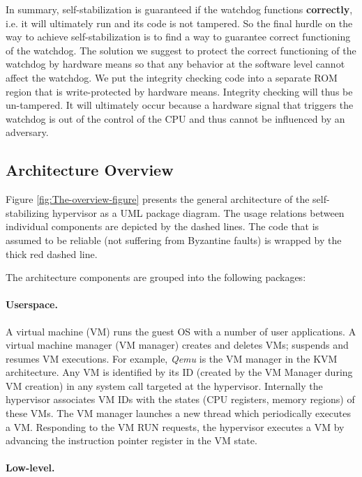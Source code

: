 In summary, self-stabilization is guaranteed if the watchdog functions
\textbf{correctly}, i.e. it will ultimately run and its code is not
tampered. So the final hurdle on the way to achieve self-stabilization
is to find a way to guarantee correct functioning of the watchdog.
The solution we suggest to protect the correct functioning of the
watchdog by hardware means so that any behavior at the software level
cannot affect the watchdog. We put the integrity checking code into
a separate ROM region that is write-protected by hardware means. Integrity
checking will thus be un-tampered. It will ultimately occur because
a hardware signal that triggers the watchdog is out of the control
of the CPU and thus cannot be influenced by an adversary.


\subsection{Architecture Overview }

Figure \ref{fig:The-overview-figure} presents the general architecture
of the self-stabilizing hypervisor as a UML package diagram. The usage
relations between individual components are depicted by the dashed
lines. The code that is assumed to be reliable (not suffering from
Byzantine faults) is wrapped by the thick red dashed line.

The architecture components are grouped into the following packages: 


\paragraph{Userspace. }

A virtual machine (VM) runs the guest OS with a number of user applications.
A virtual machine manager (VM manager) creates and deletes VMs; suspends
and resumes VM executions. For example, \textit{Qemu} is the VM manager
in the KVM \cite{kvm-site} architecture. Any VM is identified by
its ID (created by the VM Manager during VM creation) in any system
call targeted at the hypervisor. Internally the hypervisor associates
VM IDs with the states (CPU registers, memory regions) of these VMs.
The VM manager launches a new thread which periodically executes a
VM. Responding to the VM RUN requests, the hypervisor executes a VM
by advancing the instruction pointer register in the VM state. 


\paragraph{Low-level. }

